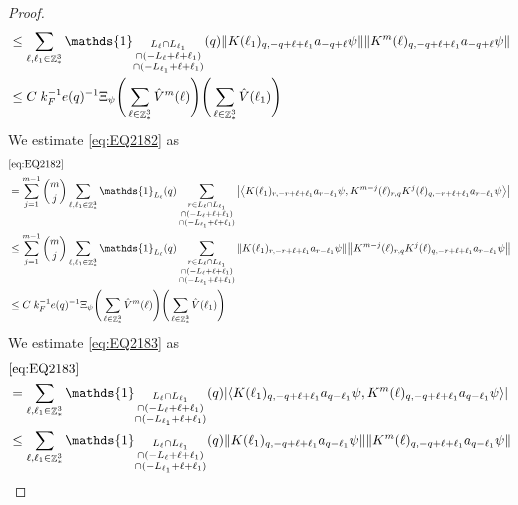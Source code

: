 \documentclass[sn-mathphys, Numbered ,a4paper]{sn-jnl}%
\DeclareMathOperator{\Z}{\mathbb{Z}}
\newcommand{\eva}[1]{\left\langle #1 \right\rangle}
\theoremstyle{plain}
\theoremstyle{definition}
\theoremstyle{remark}
\theoremstyle{plain}
\theoremstyle{definition}
\theoremstyle{remark}
\begin{document}
\begin{proof}
\begin{align}
		&\leq \sum\limits_{\ell, \ell_1\in \Z^3_*} \mathds{1}_{\substack{L_{\ell}\cap L_{\ell_1}\\\cap (-L_{\ell}+\ell+\ell_1) \\ \cap (-L_{\ell_1}+\ell+\ell_1)}}(q) \norm{ K(\ell_1)_{q,-q+\ell+\ell_1} a_{-q+\ell} \psi}\norm{ K^m(\ell)_{q,-q+\ell+\ell_1} a_{-q+\ell} \psi }\nonumber\\
		&\leq C\; k_F^{-1}e(q)^{-1} \Xi_{\psi}\Bigg(\sum\limits_{\ell \in \Z^3_*} \hat{V}^{m}(\ell) \Bigg)\Bigg(\sum\limits_{\ell \in \Z^3_*} \hat{V}(\ell_1)\Bigg) \label{eq:estEQ2181}
	\end{align}
	We estimate \eqref{eq:EQ2182} as
	\begin{align}
		& \eqref{eq:EQ2182}\nonumber\\
		&= \sum\limits_{j=1}^{m-1} {{m}\choose j} \sum\limits_{\ell, \ell_1\in \Z^3_*}\mathds{1}_{L_{\ell}}(q) \sum\limits_{\substack{r\in L_{\ell} \cap L_{\ell_1}\\\cap (-L_{\ell}+\ell+\ell_1) \\ \cap (-L_{\ell_1}+\ell+\ell_1)}}  \abs{\eva{ K(\ell_1)_{r,-r+\ell+\ell_1} a_{r-\ell_1} \psi, K^{m-j}(\ell)_{r,q} K^j(\ell)_{q,-r+\ell+\ell_1} a_{r-\ell_1} \psi }}\nonumber\\
		&\leq \sum\limits_{j=1}^{m-1} {{m}\choose j} \sum\limits_{\ell, \ell_1\in \Z^3_*}\mathds{1}_{L_{\ell}}(q) \sum\limits_{\substack{r\in L_{\ell} \cap L_{\ell_1}\\\cap (-L_{\ell}+\ell+\ell_1) \\ \cap (-L_{\ell_1}+\ell+\ell_1)}}  \norm{ K(\ell_1)_{r,-r+\ell+\ell_1} a_{r-\ell_1} \psi} \norm{ K^{m-j}(\ell)_{r,q} K^j(\ell)_{q,-r+\ell+\ell_1} a_{r-\ell_1} \psi} \nonumber\\
		&\leq C\; k_F^{-1}e(q)^{-1} \Xi_{\psi} \Bigg(\sum\limits_{\ell \in \Z^3_*} \hat{V}^{m}(\ell) \Bigg)\Bigg(\sum\limits_{\ell \in \Z^3_*} \hat{V}(\ell_1)\Bigg)  \label{eq:estEQ2182}
	\end{align}
	We estimate \eqref{eq:EQ2183} as
	\begin{align}
		& \eqref{eq:EQ2183}\nonumber\\
		&= \sum\limits_{\ell, \ell_1\in \Z^3_*} \mathds{1}_{\substack{L_{\ell}\cap L_{\ell_1}\\\cap (-L_{\ell}+\ell+\ell_1) \\ \cap (-L_{\ell_1}+\ell+\ell_1)}} (q) \abs{\eva{K(\ell_1)_{q,-q+\ell+\ell_1} a_{q-\ell_1} \psi, K^m(\ell)_{q,-q+\ell+\ell_1} a_{q-\ell_1}\psi }}\nonumber\\
		&\leq \sum\limits_{\ell, \ell_1\in \Z^3_*} \mathds{1}_{\substack{L_{\ell}\cap L_{\ell_1}\\\cap (-L_{\ell}+\ell+\ell_1) \\ \cap (-L_{\ell_1}+\ell+\ell_1)}} (q) \norm{K(\ell_1)_{q,-q+\ell+\ell_1} a_{q-\ell_1} \psi}\norm{ K^m(\ell)_{q,-q+\ell+\ell_1} a_{q-\ell_1}\psi }\nonumber\\

\end{align}
\end{proof}
\end{document}
